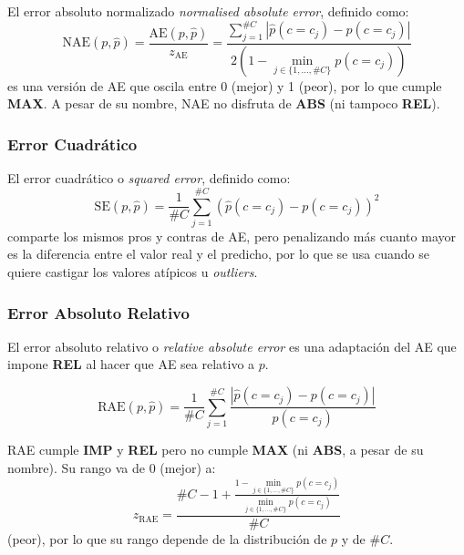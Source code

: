 El error absoluto normalizado {\it normalised absolute error}, definido como:
\begin{equation}
    {\text{NAE}(p, \hat p)} = \frac{\text{AE}(p, \hat p)}{z_{\text{AE}}} = \frac{\sum \limits_{j=1}^{\#C}{|\hat p(c=c_j) - p(c=c_j)|}}{2(1-\displaystyle \min_{j\in\{1,\dots,\#C\}}p(c=c_j))}\label{evaluacion:eq_nae}
\end{equation}
es una versión de AE que oscila entre 0 (mejor) y 1 (peor), por lo que cumple
{\bf MAX}. A pesar de su nombre, NAE no disfruta de {\bf ABS} (ni tampoco {\bf
REL}).

\subsubsection{Error Cuadrático}\label{evaluacion:se}

El error cuadrático o {\it squared error}, definido como:
\begin{equation}
    {\text{SE}(p, \hat p)} = \frac{1}{\#C}\sum \limits_{j=1}^{\#C}{{(\hat p(c=c_j) - p(c=c_j))}^2}\label{evaluacion:eq_se}
\end{equation}
comparte los mismos pros y contras de AE, pero penalizando más cuanto mayor es
la diferencia entre el valor real y el predicho, por lo que se usa cuando se
quiere castigar los valores atípicos u {\it outliers}.

\subsubsection{Error Absoluto Relativo}\label{evaluacion:rae}

El error absoluto relativo o {\it relative absolute error\/} es una adaptación
del AE que impone {\bf REL} al hacer que AE sea relativo a $p$.

\begin{equation}
    {\text{RAE}(p, \hat p)} = \frac{1}{\#C}\sum \limits_{j=1}^{\#C}{\frac{|\hat p(c=c_j) - p(c=c_j)|}{p(c=c_j)}}\label{evaluacion:eq_rae}
\end{equation}

RAE cumple {\bf IMP} y {\bf REL} pero no cumple {\bf MAX} (ni {\bf ABS}, a pesar
de su nombre). Su rango va de 0 (mejor) a:
\begin{equation}
    z_{\text{RAE}} = \frac{\#C - 1 + \frac {1 - \displaystyle \min_{j\in\{1,\dots,\#C\}}p(c=c_j)}{\displaystyle \min_{j\in\{1,\dots,\#C\}}p(c=c_j)}}{\#C}\label{evaluacion:eq_zrae}
\end{equation}
(peor), por lo que su rango depende de la distribución de $p$ y de $\#C$.

